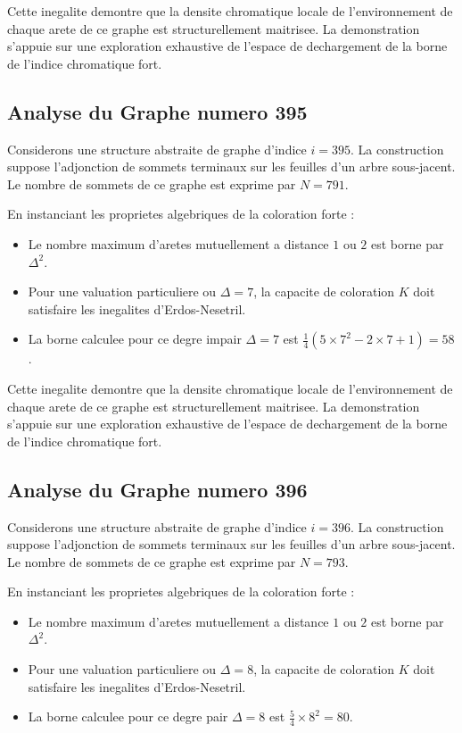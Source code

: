 \documentclass[11pt,a4paper]{article}
\begin{document}
Cette inegalite demontre que la densite chromatique locale de l'environnement de chaque arete de ce graphe est structurellement maitrisee. La demonstration s'appuie sur une exploration exhaustive de l'espace de dechargement de la borne de l'indice chromatique fort.

\subsection{Analyse du Graphe numero 395}
Considerons une structure abstraite de graphe d'indice $i = 395$. La construction suppose l'adjonction de sommets terminaux sur les feuilles d'un arbre sous-jacent. Le nombre de sommets de ce graphe est exprime par $N = 791$.

En instanciant les proprietes algebriques de la coloration forte :
\begin{itemize}
\item Le nombre maximum d'aretes mutuellement a distance $1$ ou $2$ est borne par $\Delta^2$.
\item Pour une valuation particuliere ou $\Delta = 7$, la capacite de coloration $K$ doit satisfaire les inegalites d'Erdos-Nesetril.
\item La borne calculee pour ce degre impair $\Delta = 7$ est $\frac{1}{4}(5 \times 7^2 - 2 \times 7 + 1) = 58$.
\end{itemize}

Cette inegalite demontre que la densite chromatique locale de l'environnement de chaque arete de ce graphe est structurellement maitrisee. La demonstration s'appuie sur une exploration exhaustive de l'espace de dechargement de la borne de l'indice chromatique fort.

\subsection{Analyse du Graphe numero 396}
Considerons une structure abstraite de graphe d'indice $i = 396$. La construction suppose l'adjonction de sommets terminaux sur les feuilles d'un arbre sous-jacent. Le nombre de sommets de ce graphe est exprime par $N = 793$.

En instanciant les proprietes algebriques de la coloration forte :
\begin{itemize}
\item Le nombre maximum d'aretes mutuellement a distance $1$ ou $2$ est borne par $\Delta^2$.
\item Pour une valuation particuliere ou $\Delta = 8$, la capacite de coloration $K$ doit satisfaire les inegalites d'Erdos-Nesetril.
\item La borne calculee pour ce degre pair $\Delta = 8$ est $\frac{5}{4} \times 8^2 = 80$.
\end{itemize}
\end{document}
